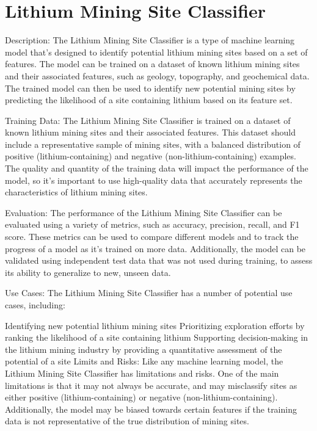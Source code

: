 \section{Lithium Mining Site Classifier}

Description:
The Lithium Mining Site Classifier is a type of machine learning model that's designed to identify potential lithium mining sites based on a set of features. The model can be trained on a dataset of known lithium mining sites and their associated features, such as geology, topography, and geochemical data. The trained model can then be used to identify new potential mining sites by predicting the likelihood of a site containing lithium based on its feature set.

Training Data:
The Lithium Mining Site Classifier is trained on a dataset of known lithium mining sites and their associated features. This dataset should include a representative sample of mining sites, with a balanced distribution of positive (lithium-containing) and negative (non-lithium-containing) examples. The quality and quantity of the training data will impact the performance of the model, so it's important to use high-quality data that accurately represents the characteristics of lithium mining sites.

Evaluation:
The performance of the Lithium Mining Site Classifier can be evaluated using a variety of metrics, such as accuracy, precision, recall, and F1 score. These metrics can be used to compare different models and to track the progress of a model as it's trained on more data. Additionally, the model can be validated using independent test data that was not used during training, to assess its ability to generalize to new, unseen data.

Use Cases:
The Lithium Mining Site Classifier has a number of potential use cases, including:

Identifying new potential lithium mining sites
Prioritizing exploration efforts by ranking the likelihood of a site containing lithium
Supporting decision-making in the lithium mining industry by providing a quantitative assessment of the potential of a site
Limits and Risks:
Like any machine learning model, the Lithium Mining Site Classifier has limitations and risks. One of the main limitations is that it may not always be accurate, and may misclassify sites as either positive (lithium-containing) or negative (non-lithium-containing). Additionally, the model may be biased towards certain features if the training data is not representative of the true distribution of mining sites.

